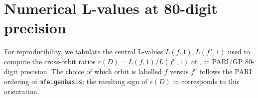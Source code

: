 \documentclass[11pt]{amsart}
\theoremstyle{definition}
\theoremstyle{remark}
\begin{document}
\section{Numerical L-values at 80-digit precision}\label{app:numerics}

For reproducibility, we tabulate the central L-values
\(L(f, 1), L(f^{\sigma}, 1)\) used to compute the cross-orbit
ratios \(r(D) = L(f, 1)/L(f^{\sigma}, 1)\) of , at
PARI/GP \(80\)-digit precision. The choice of which orbit is
labelled \(f\) versus \(f^{\sigma}\) follows the PARI ordering of
\verb|mfeigenbasis|; the resulting sign of \(e(D)\) in 
corresponds to this orientation.
\end{document}
